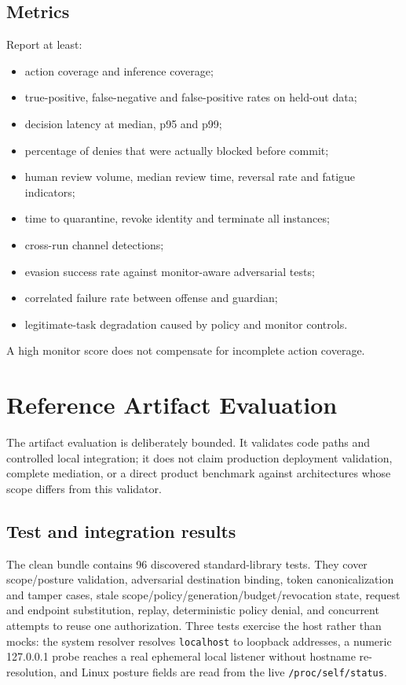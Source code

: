 \documentclass[11pt,letterpaper]{article}
\newcommand{\code}[1]{\texttt{#1}}
\begin{document}
\subsection{Metrics}
Report at least:
\begin{itemize}
  \item action coverage and inference coverage;
  \item true-positive, false-negative and false-positive rates on held-out data;
  \item decision latency at median, p95 and p99;
  \item percentage of denies that were actually blocked before commit;
  \item human review volume, median review time, reversal rate and fatigue indicators;
  \item time to quarantine, revoke identity and terminate all instances;
  \item cross-run channel detections;
  \item evasion success rate against monitor-aware adversarial tests;
  \item correlated failure rate between offense and guardian;
  \item legitimate-task degradation caused by policy and monitor controls.
\end{itemize}

A high monitor score does not compensate for incomplete action coverage.

\section{Reference Artifact Evaluation}
The artifact evaluation is deliberately bounded. It validates code paths and controlled local integration; it does not claim production deployment validation, complete mediation, or a direct product benchmark against architectures whose scope differs from this validator.

\subsection{Test and integration results}
The clean bundle contains 96 discovered standard-library tests. They cover scope/posture validation, adversarial destination binding, token canonicalization and tamper cases, stale scope/policy/generation/budget/revocation state, request and endpoint substitution, replay, deterministic policy denial, and concurrent attempts to reuse one authorization. Three tests exercise the host rather than mocks: the system resolver resolves \code{localhost} to loopback addresses, a numeric 127.0.0.1 probe reaches a real ephemeral local listener without hostname re-resolution, and Linux posture fields are read from the live \code{/proc/self/status}.
\end{document}
